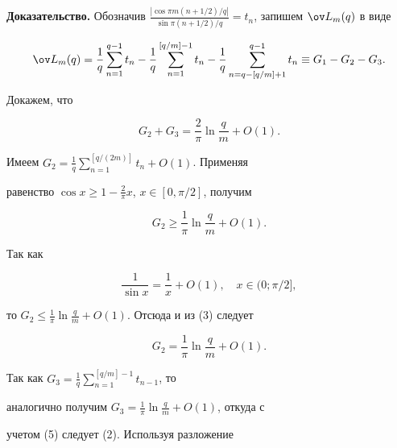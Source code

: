  


{\bf Доказательство.} Обозначив $\frac{|\cos\pi 


m(n+1/2)/q|}{\sin\pi(n+1/2)/q}=t_n$, запишем $\ov L_m(q)$ в виде 


\begin{equation} 


\ov L_m(q)=\frac{1}{q}\sum^{q-1}_{n=1}t_n-\frac{1}{q} 


\sum^{[q/m]-1}_{n=1}t_n-\frac{1}{q}\sum^{q-1}_{n=q-[q/m]+1} 


t_n\equiv G_1-G_2-G_3. 


\end{equation} 


Докажем, что 


\begin{equation} 


G_2+G_3=\frac{2}{\pi}\ln\frac{q}{m}+O(1). 


\end{equation} 


Имеем $G_2=\frac{1}{q}\sum\limits^{[q/(2m)]}_{n=1}t_n+O(1)$. Применяя 


равенство $\cos x\ge1-\frac{2}{\pi}x$, $x\in[0,\pi/2]$, получим 


\begin{equation} 


G_2\ge\frac{1}{\pi}\ln\frac{q}{m}+O(1). 


\end{equation} 


Так как 


\begin{equation} 


\frac{1}{\sin x}=\frac{1}{x}+O(1),\quad x\in(0;\pi/2], 


\end{equation} 


то $G_2\le\frac{1}{\pi}\ln\frac{q}{m}+O(1)$. Отсюда и из (3) следует 


\begin{equation} 


G_2=\frac{1}{\pi}\ln\frac{q}{m}+O(1). 


\end{equation} 


Так как $G_3=\frac{1}{q}\sum\limits^{[q/m]-1}_{n=1}t_{n-1}$, то 


аналогично получим $G_3=\frac{1}{\pi}\ln\frac{q}{m}+O(1)$, откуда с 


учетом (5) следует (2). Используя разложение 


$$ 


